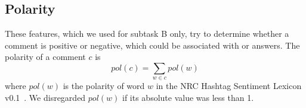 % 
% 
% 
% 
% 



\subsection{Polarity}
\label{sub:polarity}

These features, which we used for subtask B only,
try to determine whether a comment is positive or negative,
which could be associated with \yes or \no answers.
The polarity of a comment $c$ is 
\begin{equation}
pol(c) = \sum_{w\in c} pol(w) 
\end{equation}
%
where $pol(w)$ is the polarity of word $w$ in the NRC Hashtag Sentiment 
Lexicon v0.1~\cite{MohammadKZ2013}.
We disregarded $pol(w)$ if its absolute value was less than 1.

